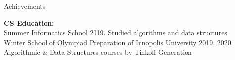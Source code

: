 \documentclass{resume} %
\begin{document}

\begin{rSection}{Achievements}

 \textbf{CS Education:} \\
  Summer Informatics School 2019. Studied algorithms and data structures \\
  Winter School of Olympiad Preparation of Innopolis University 2019, 2020\\
  Algorithmic $\&$ Data Structures courses by Tinkoff Generation

\end{rSection}






\end{document}
